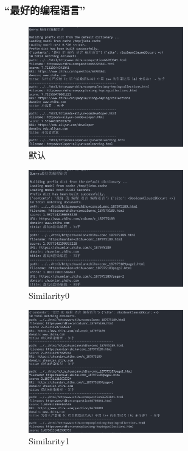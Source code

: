 \documentclass[12pt,a4paper]{article}
\begin{document}
\subsubsection{“最好的编程语言”}

\begin{figure}[H]
	\includegraphics[width=0.6\textwidth]{2_-1.png}
	\centering
	 \caption{默认}
\end{figure}
\begin{figure}[H]
	\includegraphics[width=0.6\textwidth]{2_0.png}
	\centering
	 \caption{Similarity0}
\end{figure}
\begin{figure}[H]
	\includegraphics[width=0.6\textwidth]{2_1.png}
	\centering
	 \caption{Similarity1}
\end{figure}
\end{document}
